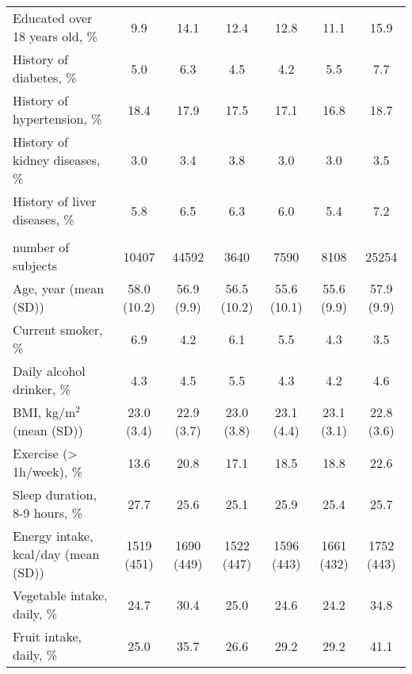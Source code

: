 \documentclass[nutrients,article,submitted,moreauthors,pdftex]{Definitions/mdpi}
\begin{document}
\begin{table}[h]
{\begin{tabular}[t]{lcccccc}
\hspace{1em}Educated over 18 years old, \% & 9.9 & 14.1 & 12.4 & 12.8 & 11.1 & 15.9 \\
\rowcolor{gray!6}  \hspace{1em}History of diabetes, \% & 5.0 & 6.3 & 4.5 & 4.2 & 5.5 & 7.7\\
\hspace{1em}History of hypertension, \% & 18.4 & 17.9 & 17.5 & 17.1 & 16.8 & 18.7\\
\rowcolor{gray!6}  \hspace{1em}History of kidney diseases, \% & 3.0 & 3.4 & 3.8 & 3.0 & 3.0 & 3.5\\
\hspace{1em}History of liver diseases, \% & 5.8 & 6.5 & 6.3 & 6.0 & 5.4 & 7.2\\
\rowcolor{gray!6}  \addlinespace[0.3em]
\multicolumn{7}{l}{\textbf{Women (n = 54999)}}\\
\hspace{1em}number of subjects & 10407 & 44592 & 3640 & 7590 & 8108 & 25254\\
\hspace{1em}Age, year (mean (SD)) & 58.0 (10.2) & 56.9 (9.9) & 56.5 (10.2) & 55.6 (10.1) & 55.6 (9.9) & 57.9 (9.9)\\
\rowcolor{gray!6}  \hspace{1em}Current smoker, \% & 6.9 & 4.2 & 6.1 & 5.5 & 4.3 & 3.5\\
\hspace{1em}Daily alcohol drinker, \% & 4.3 & 4.5 & 5.5 & 4.3 & 4.2 & 4.6\\
\rowcolor{gray!6}  \hspace{1em}BMI, kg/m$^2$ (mean (SD)) & 23.0 (3.4) & 22.9 (3.7) & 23.0 (3.8) & 23.1 (4.4) & 23.1 (3.1) & 22.8 (3.6)\\
\hspace{1em}Exercise (> 1h/week), \% & 13.6 & 20.8 & 17.1 & 18.5 & 18.8 & 22.6\\
\rowcolor{gray!6}  \hspace{1em}Sleep duration, 8-9 hours, \% & 27.7 & 25.6 & 25.1 & 25.9 & 25.4 & 25.7\\
\hspace{1em}Energy intake, kcal/day (mean (SD)) & 1519 (451) & 1690 (449) & 1522 (447) & 1596 (443) & 1661 (432) & 1752 (443)\\
\hspace{1em}Vegetable intake, daily, \% & 24.7 & 30.4 & 25.0 & 24.6 & 24.2 & 34.8\\
\rowcolor{gray!6}  \hspace{1em}Fruit intake, daily, \% & 25.0 & 35.7 & 26.6 & 29.2 & 29.2 & 41.1\\

\end{tabular}}
\end{table}
\end{document}
